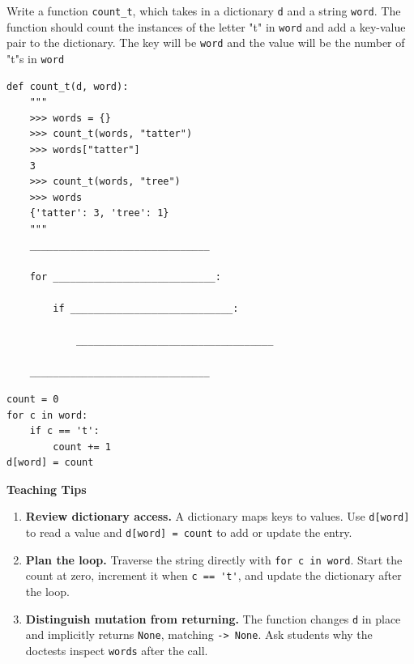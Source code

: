 \begin{blocksection}
\question Write a function \lstinline$count_t$, which takes in a dictionary \lstinline$d$ and a string \lstinline$word$.
The function should count the instances of the letter "t" in \lstinline$word$ and add a key-value pair to the dictionary.
The key will be \lstinline$word$ and the value will be the number of "t"s in \lstinline$word$

\begin{lstlisting}
def count_t(d, word):
    """
    >>> words = {}
    >>> count_t(words, "tatter")
    >>> words["tatter"]
    3
    >>> count_t(words, "tree")
    >>> words
    {'tatter': 3, 'tree': 1}
    """
    _______________________________
    
    for ____________________________:

        if ____________________________:

            __________________________________

    _______________________________

\end{lstlisting}

\begin{solution}
\begin{lstlisting}
count = 0
for c in word:
    if c == 't':
        count += 1
d[word] = count
\end{lstlisting}
\end{solution}

\begin{blocksection}
    \begin{meta}
    \textbf{Teaching Tips}
    \begin{enumerate}
        \item \textbf{Review dictionary access.}
        A dictionary maps keys to values. Use \lstinline{d[word]} to read a value
        and \lstinline{d[word] = count} to add or update the entry.
    
        \item \textbf{Plan the loop.}
        Traverse the string directly with \lstinline{for c in word}.
        Start the count at zero, increment it when \lstinline{c == 't'},
        and update the dictionary after the loop.
    
        \item \textbf{Distinguish mutation from returning.}
        The function changes \lstinline{d} in place and implicitly returns
        \lstinline{None}, matching \lstinline{-> None}.
        Ask students why the doctests inspect \lstinline{words} after the call.
    \end{enumerate}
    \end{meta}
\end{blocksection}

\end{blocksection}
